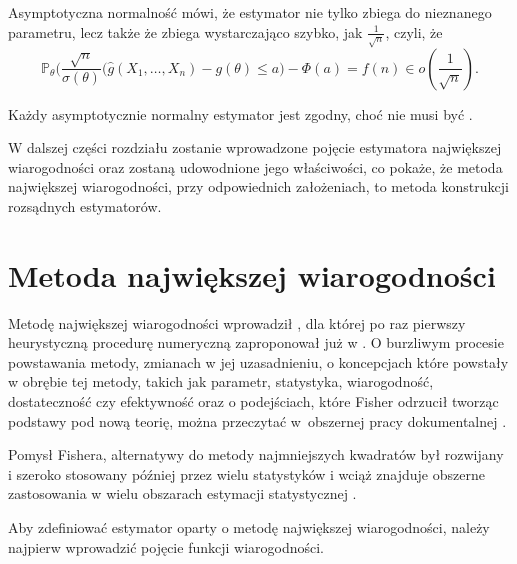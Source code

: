Asymptotyczna normalność mówi, że estymator nie tylko zbiega do nieznanego parametru, lecz także że zbiega wystarczająco szybko, jak $\frac{1}{\sqrt{n}}$, czyli, że 
$$\mathbb{P}_{\theta} \Big(\dfrac{\sqrt{n}}{\sigma(\theta)}(\hat{g}(X_1,\dots,X_n) -g(\theta) \leq a \Big) - \Phi(a) = f(n) \in o(\frac{1}{\sqrt{n}}) . $$ 

Każdy asymptotycznie normalny estymator jest zgodny, choć nie musi być \textit{}.

W dalszej części rozdziału zostanie wprowadzone pojęcie estymatora największej wiarogodności oraz zostaną udowodnione jego właściwości, co pokaże, że metoda największej wiarogodności, przy odpowiednich założeniach, to metoda konstrukcji rozsądnych estymatorów.

\newpage 

\section{Metoda największej wiarogodności}

Metodę największej wiarogodności wprowadził \cite{fisher2}, dla której po raz pierwszy heurystyczną procedurę numeryczną zaproponował już w \cite{fisher1}. O burzliwym procesie powstawania metody, zmianach w jej uzasadnieniu, o koncepcjach które powstały w obrębie tej metody, takich jak parametr, statystyka, wiarogodność, dostateczność czy efektywność oraz o podejściach, które Fisher odrzucił tworząc podstawy pod nową teorię, można przeczytać w~obszernej pracy dokumentalnej \citet{aldrich1}. 

Pomysł Fishera, alternatywy do metody najmniejszych kwadratów \citep{legendre1, gauss1} był rozwijany i szeroko stosowany później przez wielu statystyków i wciąż znajduje obszerne zastosowania w wielu obszarach estymacji statystycznej \citep{hutch1, kenward1, millar1}.

Aby zdefiniować estymator oparty o metodę największej wiarogodności, należy najpierw wprowadzić pojęcie funkcji wiarogodności.



